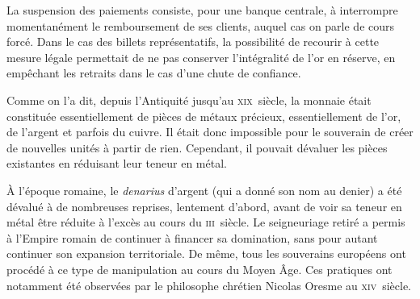 La suspension des paiements consiste, pour une banque centrale, à interrompre momentanément le remboursement de ses clients, auquel cas on parle de cours forcé. Dans le cas des billets représentatifs, la possibilité de recourir à cette mesure légale permettait de ne pas conserver l'intégralité de l'or en réserve, en empêchant les retraits dans le cas d'une chute de confiance.



Comme on l'a dit, depuis l'Antiquité jusqu'au \textsc{xix}\ieme{}~siècle, la monnaie était constituée essentiellement de pièces de métaux précieux, essentiellement de l'or, de l'argent et parfois du cuivre. Il était donc impossible pour le souverain de créer de nouvelles unités à partir de rien. Cependant, il pouvait dévaluer les pièces existantes en réduisant leur teneur en métal.

À l'époque romaine, le \emph{denarius} d'argent (qui a donné son nom au denier) a été dévalué à de nombreuses reprises, lentement d'abord, avant de voir sa teneur en métal être réduite à l'excès au cours du \textsc{iii}\ieme{}~siècle. Le seigneuriage retiré a permis à l'Empire romain de continuer à financer sa domination, sans pour autant continuer son expansion territoriale. De même, tous les souverains européens ont procédé à ce type de manipulation au cours du Moyen Âge. Ces pratiques ont notamment été observées par le philosophe chrétien Nicolas Oresme au \textsc{xiv}\ieme{}~siècle. %

